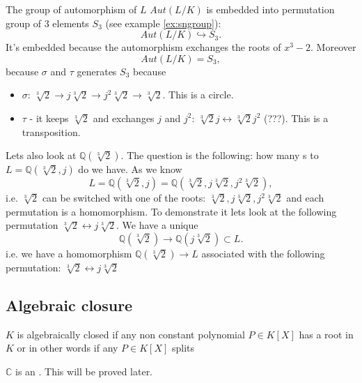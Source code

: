 \begin{example}
  The group of automorphism of $L$ $Aut\left(L/K\right)$ is embedded
  into permutation group of 3 elements $S_3$ (see example \ref{ex:sngroup}):
  \[
  Aut\left(L/K\right) \hookrightarrow S_3.
  \]
  It's embedded because the automorphism exchanges the roots of
  $x^3-2$. Moreover
  \[
  Aut\left(L/K\right) = S_3,
  \]
  because $\sigma$ and $\tau$ generates $S_3$ because
  \begin{itemize}
  \item $\sigma$: $\sqrt[3]{2} \to j \sqrt[3]{2} \to j^2 \sqrt[3]{2}
    \to \sqrt[3]{2}$. This is a circle.
  \item $\tau$ - it keeps $\sqrt[3]{2}$ and exchanges $j$ and $j^2$:
    $\sqrt[3]{2} j \leftrightarrow \sqrt[3]{2} j^2$ (???). This is a
    transposition. 
  \end{itemize}

  Lets also look at $\mathbb{Q}\left(\sqrt[3]{2}\right)$. The question
  is the following: how many s to $L =
  \mathbb{Q}\left(\sqrt[3]{2}, j\right)$ do we have. As we know
  \[
  L = \mathbb{Q}\left(\sqrt[3]{2}, j\right) =
  \mathbb{Q}\left(\sqrt[3]{2}, j\sqrt[3]{2}, j^2\sqrt[3]{2}\right),
  \]
  i.e. $\sqrt[3]{2}$ can be switched with one of the roots:
  $\sqrt[3]{2}, j\sqrt[3]{2}, j^2\sqrt[3]{2}$ and each permutation is a
  homomorphism. To demonstrate it lets look at the following
  permutation $\sqrt[3]{2} \leftrightarrow j\sqrt[3]{2}$. We have a
  unique 
  \[
  \mathbb{Q}\left(\sqrt[3]{2}\right) \to
  \mathbb{Q}\left(j\sqrt[3]{2}\right) \subset L.
  \]
  i.e. we have a homomorphism $\mathbb{Q}\left(\sqrt[3]{2}\right) \to
  L$ associated with the following permutation:
  $\sqrt[3]{2} \leftrightarrow j\sqrt[3]{2}$
\end{example}

\subsection{Algebraic closure}

\begin{definition}
  $K$ is algebraically closed if any non constant polynomial $P \in
  K\left[X\right]$ has a root in $K$ or in other words if any $P \in
  K\left[X\right]$ splits
  \label{def:algebraicallyclosed}
\end{definition}

\begin{example}[$\mathbb{C}$]
  $\mathbb{C}$ is an . This will be
  proved later.
\end{example}

